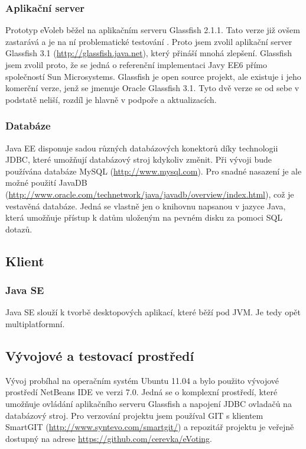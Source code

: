 \documentclass[11pt,twoside,a4paper]{book}
\begin{document}
\subsubsection{Aplikační server} \label{aplikacni_server}

Prototyp eVoleb běžel na aplikačním serveru Glassfish 2.1.1. Tato verze již ovšem zastarává a je na ní problematické testování \cite{www:prototyp}. Proto jsem zvolil aplikační server Glassfish 3.1 (\url{http://glassfish.java.net}), který přináší mnohá zlepšení. Glassfish jsem zvolil proto, že se jedná o referenční implementaci Javy EE6 přímo společností Sun Microsystems. Glassfish je open source projekt, ale existuje i jeho komerční verze, jenž se jmenuje Oracle Glassfish 3.1. Tyto dvě verze se od sebe v podstatě neliší, rozdíl je hlavně v podpoře a aktualizacích.

\subsubsection{Databáze}

Java EE disponuje sadou různých databázových konektorů díky technologii JDBC, které umožňují databázový stroj kdykoliv změnit. Při vývoji bude používána databáze MySQL (\url{http://www.mysql.com}). Pro snadné nasazení je ale možné použití JavaDB (\url{http://www.oracle.com/technetwork/java/javadb/overview/index.html}), což je vestavěná databáze. Jedná se vlastně jen o knihovnu napsanou v jazyce Java, která umožňuje přístup k datům uloženým na pevném disku za pomoci SQL dotazů.

\subsection{Klient}

\subsubsection{Java SE}

Java SE slouží k tvorbě desktopových aplikací, které běží pod JVM. Je tedy opět multiplatformní.

\subsection{Vývojové a testovací prostředí}

Vývoj probíhal na operačním systém Ubuntu 11.04 a bylo použito vývojové prostředí NetBeans IDE ve verzi 7.0. Jedná se o komplexní prostředí, které umožňuje ovládání aplikačního serveru Glassfish a napojení JDBC ovladačů na databázový stroj. Pro verzování projektu jsem používal GIT s klientem SmartGIT (\url{http://www.syntevo.com/smartgit/}) a repozitář projektu je veřejně dostupný na adrese \url{https://github.com/cerevka/eVoting}.
\end{document}

